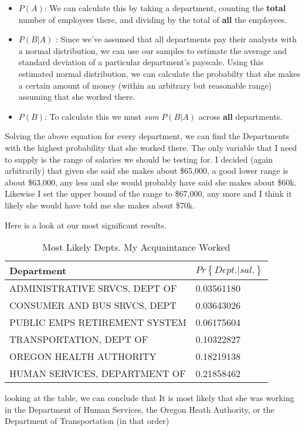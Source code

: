 \documentclass[letterpaper]{article}
\theoremstyle{definition}
\begin{document}
\begin{itemize}
	\item 
		$P(A)$: We can calculate this by taking a department, counting the \textbf{total}
		number of employees there, and dividing by the total of \textbf{all} the
		employees.
	\item
		$P(B|A)$ : Since we've assumed that all departments pay their analysts with a
		normal distribution, we can use our samples to estimate the average and standard
		deviation of a particular department's payscale. Using this estimated normal
		distribution,  we can calculate the probabilty that she makes a certain amount of
		money (within an arbitrary but reasonable range)  assuming that she worked there.
	\item
		$P(B)$: To calculate this we must \emph{sum} $P(B|A)$ across  \textbf{all}
		departments.
\end{itemize}

Solving the above equation for every department, we can find the Departments with the
highest probability that she worked there. The only variable that I need to supply is the
range of salaries we should be testing for. I decided (again arbitrarily) that given she
said she makes about \$65,000, a good lower range is about \$63,000, any less and she
would probably have said she makes about \$60k. Likewise I set the upper bound of the
range to \$67,000, any more and I think it likely she would have told me she makes about
\$70k.

Here is a look at our most significant results.

\begin{table}[h]
	\center
	\caption{Most Likely Depts. My Acquaintance Worked }
	\label{tab:2}
	\begin{tabular}{ll}
  Department & $Pr\left\{ Dept. | sal. \right\} $\\
\hline
	 ADMINISTRATIVE SRVCS, DEPT OF & 0.03561180\\
	 CONSUMER AND BUS SRVCS, DEPT  & 0.03643026\\
	 PUBLIC EMPS RETIREMENT SYSTEM & 0.06175604\\
	 TRANSPORTATION, DEPT OF       & 0.10322827\\
	 OREGON HEALTH AUTHORITY       & 0.18219138\\
	 HUMAN SERVICES, DEPARTMENT OF & 0.21858462\\
\end{tabular}
\end{table}

looking at the table, we can conclude that It is most likely that she was working in the
Department of Human Services, the Oregon Heath Authority, or the Department of
Transportation (in that order)
\end{document}
